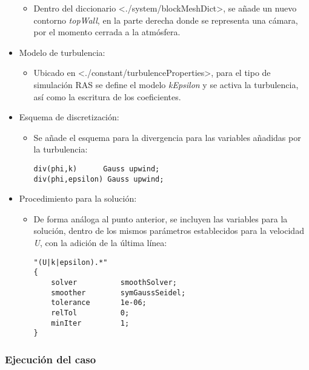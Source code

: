 \begin{itemize}
  \begin{itemize}
  \item
    Dentro del diccionario
    \textless{}./system/blockMeshDict\textgreater{}, se añade un nuevo
    contorno \emph{topWall}, en la parte derecha donde se representa una
    cámara, por el momento cerrada a la atmósfera.
  \end{itemize}
\item
  Modelo de turbulencia:

  \begin{itemize}
  \item
    Ubicado en \textless{}./constant/turbulenceProperties\textgreater{},
    para el tipo de simulación RAS se define el modelo \emph{kEpsilon} y
    se activa la turbulencia, así como la escritura de los coeficientes.
  \end{itemize}
\item
  Esquema de discretización:

  \begin{itemize}
  \item
    Se añade el esquema para la divergencia para las variables añadidas
    por la turbulencia:

\begin{verbatim}
div(phi,k)      Gauss upwind;
div(phi,epsilon) Gauss upwind;
\end{verbatim}
  \end{itemize}
\item
  Procedimiento para la solución:

  \begin{itemize}
  \item
    De forma análoga al punto anterior, se incluyen las variables para
    la solución, dentro de los mismos parámetros establecidos para la
    velocidad \emph{U}, con la adición de la última línea:

\begin{verbatim}
"(U|k|epsilon).*"
{
    solver          smoothSolver;
    smoother        symGaussSeidel;
    tolerance       1e-06;
    relTol          0;
    minIter         1;
}
\end{verbatim}
  \end{itemize}
\end{itemize}

\subsubsection{Ejecución del caso}\label{header-n819}

